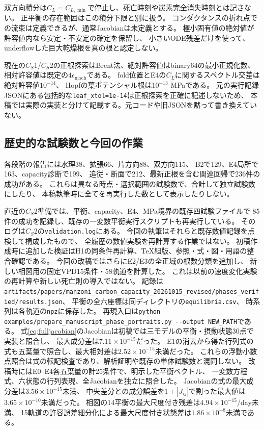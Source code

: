 \documentclass[a4paper,11pt]{ltjsarticle}
\newcommand{\code}[1]{\nolinkurl{#1}}
\begin{document}
双方向積分は$C_L=C_{L,\min}$で停止し、死亡時刻や炭素完全消失時刻とは記さない。
正平衡の存在範囲はこの積分下限と別に扱う。
コンダクタンスの折れ点での流束は定義できるが、通常Jacobianは未定義とする。
極小固有値の絶対値が許容値内なら安定・不安定の確定を保留し、
小さいODE残差だけを使って、underflowした巨大乾燥根を真の根と認定しない。

現在の$C_S$1/$C_S$2の正根探索はBrent法、絶対許容値はbinary64の最小正規化数、
相対許容値は既定の$4\epsilon_{\mathrm{mach}}$である。
fold位置とE4の$C_L$に関するスペクトル交差は絶対許容値$10^{-14}$、
Hopfの葉ポテンシャル根は$10^{-13}$ MPaである。
元の実行記録JSONにある包括的な\code{leaf_xtol=1e-14}は正根探索を正確に記述しないため、
本稿では実際の実装と分けて記載する。元コードや旧JSONを黙って書き換えていない。

\subsection{歴史的な試験数と今回の作業}
各段階の報告には水理38、拡張66、片方向88、双方向115、
B2で129、E4局所で163、capacity診断で199、
追従・断面で212、最新正根を含む関連回帰で236件の成功がある。
これらは異なる時点・選択範囲の試験数で、合計して独立試験数にしたり、
本稿執筆時に全てを再実行した数として表示したりしない。

直近の$C_S$2準備では、平衡、capacity、E4、MPa境界の既存四試験ファイルで
85件の成功を記録し、既存の一変数平衡実行スクリプトも再実行している。
そのログは$C_S$2の\code{validation.log}にある。
今回の執筆はそれらと既存数値記録を点検して構成したもので、
全履歴の数値実験を再計算する作業ではない。
初稿作成時に追加した検証はH1の同条件再計算、TeX組版、参照・式・図・用語の整合確認である。
今回の改稿ではさらにE2/E3の全正域の根数分類を追加し、
新しい相図用の固定VPD15条件・58軌道を計算した。
これは以前の速度変化実験の再計算や新しい死亡則の導入ではない。
記録は\code{artifacts/papers/manzoni_carbon_capacity_20261015_revised/phases_verified/results.json}、
平衡の全六座標は同ディレクトリの\code{equilibria.csv}、
時系列は各軌道の\code{npz}に保存した。
再現入口は\code{python examples/prepare_manuscript_phase_portraits.py --output NEW_PATH}である。
式\eqref{eq:fulljacobian}のJacobianは初稿では三モデルの平衡・摂動状態30点で実装と照合し、
最大成分差は$7.11\times10^{-15}$だった。
E1の消去から得た行列式の式も五葉量で照合し、最大相対差は$2.52\times10^{-15}$未満だった。
これらの浮動小数点照合は式の転記検査であり、解析証明や既存の単体試験数と混同しない。
改稿時にはE0--E4各五葉量の計25条件で、明示した平衡ベクトル、
一変数方程式、六状態の行列表現、全Jacobianを独立に照合した。
Jacobianの式の最大成分差は$3.56\times10^{-15}$未満、
中央差分との成分誤差を$1+|J_{ij}|$で割った最大値は$3.65\times10^{-10}$未満だった。
相図の14平衡の最大尺度付き残差は$4.94\times10^{-15}$/day未満、
15軌道の許容誤差細分化による最大尺度付き状態差は$1.86\times10^{-8}$未満である。
\end{document}
